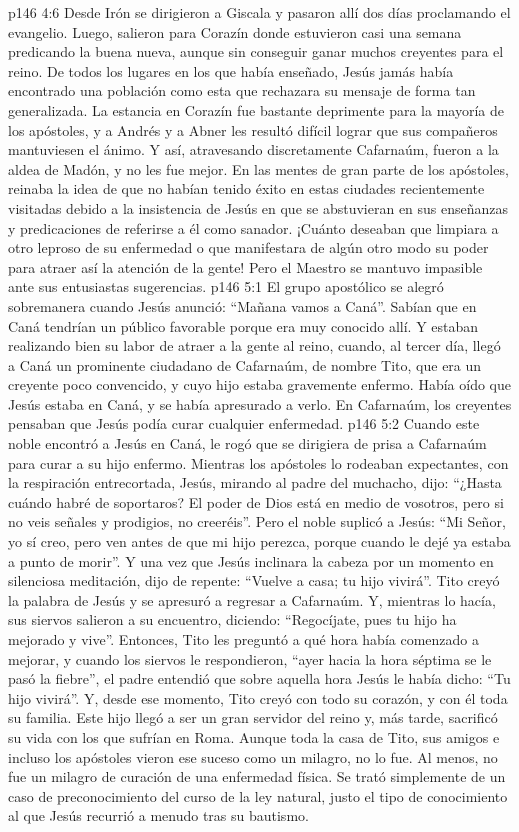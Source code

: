 \vs p146 4:6 \pc Desde Irón se dirigieron a Giscala y pasaron allí dos días proclamando el evangelio. Luego, salieron para Corazín donde estuvieron casi una semana predicando la buena nueva, aunque sin conseguir ganar muchos creyentes para el reino. De todos los lugares en los que había enseñado, Jesús jamás había encontrado una población como esta que rechazara su mensaje de forma tan generalizada. La estancia en Corazín fue bastante deprimente para la mayoría de los apóstoles, y a Andrés y a Abner les resultó difícil lograr que sus compañeros mantuviesen el ánimo. Y así, atravesando discretamente Cafarnaúm, fueron a la aldea de Madón, y no les fue mejor. En las mentes de gran parte de los apóstoles, reinaba la idea de que no habían tenido éxito en estas ciudades recientemente visitadas debido a la insistencia de Jesús en que se abstuvieran en sus enseñanzas y predicaciones de referirse a él como sanador. ¡Cuánto deseaban que limpiara a otro leproso de su enfermedad o que manifestara de algún otro modo su poder para atraer así la atención de la gente! Pero el Maestro se mantuvo impasible ante sus entusiastas sugerencias.
\vs p146 5:1 El grupo apostólico se alegró sobremanera cuando Jesús anunció: “Mañana vamos a Caná”. Sabían que en Caná tendrían un público favorable porque era muy conocido allí. Y estaban realizando bien su labor de atraer a la gente al reino, cuando, al tercer día, llegó a Caná un prominente ciudadano de Cafarnaúm, de nombre Tito, que era un creyente poco convencido, y cuyo hijo estaba gravemente enfermo. Había oído que Jesús estaba en Caná, y se había apresurado a verlo. En Cafarnaúm, los creyentes pensaban que Jesús podía curar cualquier enfermedad.
\vs p146 5:2 Cuando este noble encontró a Jesús en Caná, le rogó que se dirigiera de prisa a Cafarnaúm para curar a su hijo enfermo. Mientras los apóstoles lo rodeaban expectantes, con la respiración entrecortada, Jesús, mirando al padre del muchacho, dijo: “¿Hasta cuándo habré de soportaros? El poder de Dios está en medio de vosotros, pero si no veis señales y prodigios, no creeréis”. Pero el noble suplicó a Jesús: “Mi Señor, yo sí creo, pero ven antes de que mi hijo perezca, porque cuando le dejé ya estaba a punto de morir”. Y una vez que Jesús inclinara la cabeza por un momento en silenciosa meditación, dijo de repente: “Vuelve a casa; tu hijo vivirá”. Tito creyó la palabra de Jesús y se apresuró a regresar a Cafarnaúm. Y, mientras lo hacía, sus siervos salieron a su encuentro, diciendo: “Regocíjate, pues tu hijo ha mejorado y vive”. Entonces, Tito les preguntó a qué hora había comenzado a mejorar, y cuando los siervos le respondieron, “ayer hacia la hora séptima se le pasó la fiebre”, el padre entendió que sobre aquella hora Jesús le había dicho: “Tu hijo vivirá”. Y, desde ese momento, Tito creyó con todo su corazón, y con él toda su familia. Este hijo llegó a ser un gran servidor del reino y, más tarde, sacrificó su vida con los que sufrían en Roma. Aunque toda la casa de Tito, sus amigos e incluso los apóstoles vieron ese suceso como un milagro, no lo fue. Al menos, no fue un milagro de curación de una enfermedad física. Se trató simplemente de un caso de preconocimiento del curso de la ley natural, justo el tipo de conocimiento al que Jesús recurrió a menudo tras su bautismo.
